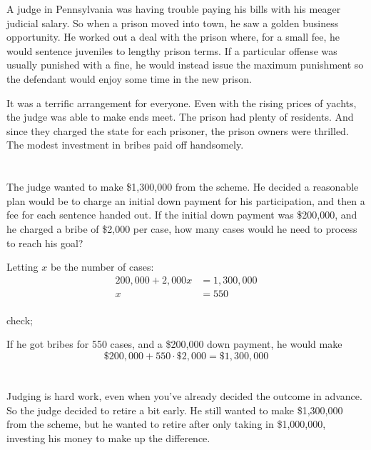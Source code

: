 \documentclass[letterpaper]{exam}
\begin{document}
\begin{questions}
\begin{solution}
      \end{solution}

    \question{}
      A judge in Pennsylvania was having trouble paying his bills with his meager judicial salary.  So when a prison
      moved into town, he saw a golden business opportunity.  He worked out a deal with the prison where, for a small
      fee, he would sentence juveniles to lengthy prison terms.  If a particular offense was usually punished with a
      fine, he would instead issue the maximum punishment so the defendant would enjoy some time in the new prison.

      It was a terrific arrangement for everyone.  Even with the rising prices of yachts, the judge was able to make
      ends meet.  The prison had plenty of residents.  And since they charged the state for each prisoner, the prison
      owners were thrilled. The modest investment in bribes paid off handsomely.

      \begin{parts}
        \part{}
          The judge wanted to make \$1,300,000 from the scheme.  He decided a reasonable plan would be to charge an
          initial down payment for his participation, and then a fee for each sentence handed out.  If the initial down
          payment was \$200,000, and he charged a bribe of \$2,000 per case, how many cases would he need to process to
          reach his goal?

          \begin{solution}
            Letting $x$ be the number of cases:
            \begin{align*}
              200,000 + 2,000x & = 1,300,000 \\
              x                & = \boxed{ 550 } \\
            \end{align*}

            check; 
            
            If he got bribes for 550 cases, and a \$200,000 down payment, he would make 
            \[
              \$200,000 + 550 \cdot \$2,000 = \$1,300,000
            \]
          \end{solution}

        \part{}
          Judging is hard work, even when you've already decided the outcome in advance.  So the judge decided to retire
          a bit early.  He still wanted to make \$1,300,000 from the scheme, but he wanted to retire after only taking
          in \$1,000,000, investing his money to make up the difference.  


\end{parts}
\end{questions}
\end{document}
